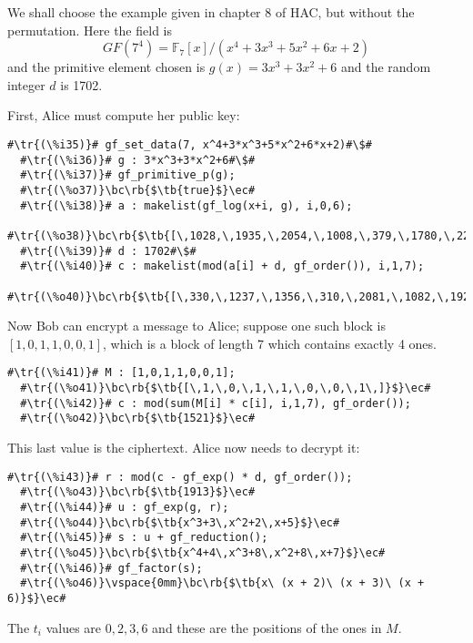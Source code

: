 \documentclass[a4paper,11pt,leqno,fleqn]{artikel3}
\newcommand{\bc}{\begin{center}}
\newcommand{\ec}{\end{center}}
\newcommand{\tr}[1]{\textcolor{red}{#1}}
\newcommand{\tb}[1]{\textcolor{blue}{#1}}
\newcommand{\rb}[1]{\raisebox{2mm}[0mm][1mm]{#1}}
\begin{document}
We shall choose the example given in chapter 8 of HAC, but without the
permutation.  Here the field is
\[
GF(7^4)=\mathbb{F}_7[x]/(x^4+3x^3+5x^2+6x+2)
\]
and the primitive element chosen is $g(x)=3x^3+3x^2+6$ and the random integer
$d$ is 1702.

First, Alice must compute her public key:


\vspace*{2mm}
\begin{lstlisting}[escapechar=\#]
  #\tr{(\%i35)}# gf_set_data(7, x^4+3*x^3+5*x^2+6*x+2)#\$#
  #\tr{(\%i36)}# g : 3*x^3+3*x^2+6#\$#
  #\tr{(\%i37)}# gf_primitive_p(g);
  #\tr{(\%o37)}\bc\rb{$\tb{true}$}\ec#
  #\tr{(\%i38)}# a : makelist(gf_log(x+i, g), i,0,6);
  #\tr{(\%o38)}\bc\rb{$\tb{[\,1028,\,1935,\,2054,\,1008,\,379,\,1780,\,223\,]}$}\ec#
  #\tr{(\%i39)}# d : 1702#\$#
  #\tr{(\%i40)}# c : makelist(mod(a[i] + d, gf_order()), i,1,7);
  #\tr{(\%o40)}\bc\rb{$\tb{[\,330,\,1237,\,1356,\,310,\,2081,\,1082,\,1925\,]}$}\ec#
\end{lstlisting}

Now Bob can encrypt a message to Alice; suppose one such block is
$[1,0,1,1,0,0,1]$, which is a block of length 7 which contains exactly 4 ones.

\vspace*{2mm}
\begin{lstlisting}[escapechar=\#]
  #\tr{(\%i41)}# M : [1,0,1,1,0,0,1];
  #\tr{(\%o41)}\bc\rb{$\tb{[\,1,\,0,\,1,\,1,\,0,\,0,\,1\,]}$}\ec#
  #\tr{(\%i42)}# c : mod(sum(M[i] * c[i], i,1,7), gf_order());
  #\tr{(\%o42)}\bc\rb{$\tb{1521}$}\ec#
\end{lstlisting}

This last value is the ciphertext.  Alice now needs to decrypt it:

\vspace*{2mm}
\begin{lstlisting}[escapechar=\#]
  #\tr{(\%i43)}# r : mod(c - gf_exp() * d, gf_order());
  #\tr{(\%o43)}\bc\rb{$\tb{1913}$}\ec#
  #\tr{(\%i44)}# u : gf_exp(g, r);
  #\tr{(\%o44)}\bc\rb{$\tb{x^3+3\,x^2+2\,x+5}$}\ec#
  #\tr{(\%i45)}# s : u + gf_reduction();
  #\tr{(\%o45)}\bc\rb{$\tb{x^4+4\,x^3+8\,x^2+8\,x+7}$}\ec#
  #\tr{(\%i46)}# gf_factor(s);
  #\tr{(\%o46)}\vspace{0mm}\bc\rb{$\tb{x\ (x + 2)\ (x + 3)\ (x + 6)}$}\ec#
\end{lstlisting}

The $t_i$ values are $0,2,3,6$ and these are the positions of the ones in $M$.
\end{document}

